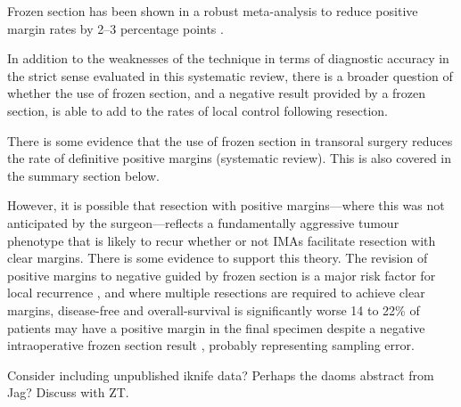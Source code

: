 Frozen section has been shown in a robust meta-analysis to reduce positive margin rates by 2--3 percentage points \cite{gorpheSystematicReviewMetaanalysis2019}.

In addition to the weaknesses of the technique in terms of diagnostic accuracy in the strict sense evaluated in this systematic review, there is a broader question of whether the use of frozen section, and a negative result provided by a frozen section, is able to add to the rates of local control following resection.

There is some evidence that the use of frozen section in transoral surgery reduces the rate of definitive positive margins (systematic review)\cite{gorpheSystematicReviewMetaanalysis2019}. This is also covered in the summary section below.

However, it is possible that resection with positive margins---where this was not anticipated by the surgeon---reflects a fundamentally aggressive tumour phenotype that is likely to recur whether or not IMAs facilitate resection with clear margins.
There is some evidence to support this theory.
The revision of positive margins to negative guided by frozen section is a major risk factor for local recurrence \cite{ettlt.PositiveFrozenSection2016}, and where multiple resections are required to achieve clear margins, disease-free and overall-survival is significantly worse \cite{mooreTransoralRoboticSurgery2018}
14 to 22\% of patients may have a positive margin in the final specimen despite a negative intraoperative frozen section result \cite{ordAccuracyFrozenSections1997, due.RefiningUtilityRole2016}, probably representing sampling error.

Consider including unpublished iknife data? Perhaps the daoms abstract from Jag? Discuss with ZT.

